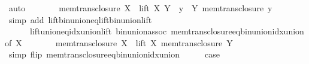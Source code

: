 \begin{isabellebody}
\ auto\isanewline
\ \ \isamarkupfalse%
\ \isamarkupfalse%
\ {\isachardoublequoteopen}{\isachardot}{\kern0pt}{\isachardot}{\kern0pt}{\isachardot}{\kern0pt}\ {\isacharequal}{\kern0pt}\ mem{\isacharunderscore}{\kern0pt}trans{\isacharunderscore}{\kern0pt}closure\ X\ {\isasymunion}\ lift\ X\ {\isacharparenleft}{\kern0pt}Y\ {\isasymunion}\ {\isacharparenleft}{\kern0pt}{\isasymUnion}y\ {\isasymin}\ Y{\isachardot}{\kern0pt}\ mem{\isacharunderscore}{\kern0pt}trans{\isacharunderscore}{\kern0pt}closure\ y{\isacharparenright}{\kern0pt}{\isacharparenright}{\kern0pt}{\isachardoublequoteclose}\isanewline
\ \ \ \ \isamarkupfalse%
\ {\isacharparenleft}{\kern0pt}simp\ add{\isacharcolon}{\kern0pt}\ lift{\isacharunderscore}{\kern0pt}bin{\isacharunderscore}{\kern0pt}union{\isacharunderscore}{\kern0pt}eq{\isacharunderscore}{\kern0pt}lift{\isacharunderscore}{\kern0pt}bin{\isacharunderscore}{\kern0pt}union{\isacharunderscore}{\kern0pt}lift\isanewline
\ \ \ \ \ \ lift{\isacharunderscore}{\kern0pt}union{\isacharunderscore}{\kern0pt}eq{\isacharunderscore}{\kern0pt}idx{\isacharunderscore}{\kern0pt}union{\isacharunderscore}{\kern0pt}lift\ bin{\isacharunderscore}{\kern0pt}union{\isacharunderscore}{\kern0pt}assoc\ mem{\isacharunderscore}{\kern0pt}trans{\isacharunderscore}{\kern0pt}closure{\isacharunderscore}{\kern0pt}eq{\isacharunderscore}{\kern0pt}bin{\isacharunderscore}{\kern0pt}union{\isacharunderscore}{\kern0pt}idx{\isacharunderscore}{\kern0pt}union{\isacharbrackleft}{\kern0pt}of\ X{\isacharbrackright}{\kern0pt}{\isacharparenright}{\kern0pt}\isanewline
\ \ \isamarkupfalse%
\ \isamarkupfalse%
\ {\isachardoublequoteopen}{\isachardot}{\kern0pt}{\isachardot}{\kern0pt}{\isachardot}{\kern0pt}\ {\isacharequal}{\kern0pt}\ mem{\isacharunderscore}{\kern0pt}trans{\isacharunderscore}{\kern0pt}closure\ X\ {\isasymunion}\ lift\ X\ {\isacharparenleft}{\kern0pt}mem{\isacharunderscore}{\kern0pt}trans{\isacharunderscore}{\kern0pt}closure\ Y{\isacharparenright}{\kern0pt}{\isachardoublequoteclose}\isanewline
\ \ \ \ \isamarkupfalse%
\ {\isacharparenleft}{\kern0pt}simp\ flip{\isacharcolon}{\kern0pt}\ mem{\isacharunderscore}{\kern0pt}trans{\isacharunderscore}{\kern0pt}closure{\isacharunderscore}{\kern0pt}eq{\isacharunderscore}{\kern0pt}bin{\isacharunderscore}{\kern0pt}union{\isacharunderscore}{\kern0pt}idx{\isacharunderscore}{\kern0pt}union{\isacharparenright}{\kern0pt}\isanewline
\ \ \isamarkupfalse%
\ \isamarkupfalse%
\ {\isacharquery}{\kern0pt}case\ \isacommand{{\isachardot}{\kern0pt}}\isamarkupfalse%

\end{isabellebody}
